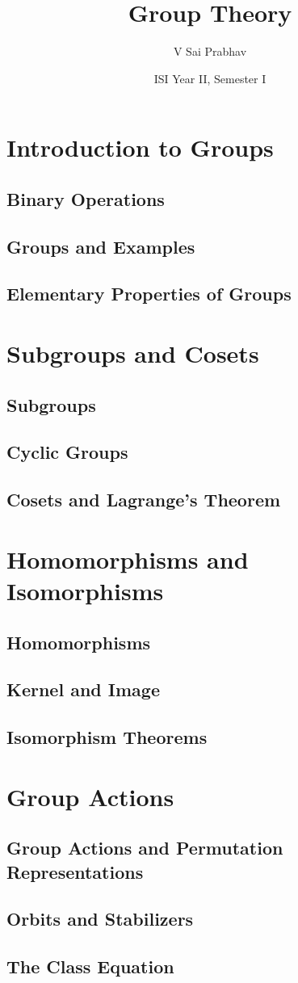 \documentclass{book}
\title{Group Theory}
\author{V Sai Prabhav}
\date{ISI Year II, Semester I}
\begin{document}
\maketitle

\chapter{Introduction to Groups}
\section{Binary Operations}
\section{Groups and Examples}
\section{Elementary Properties of Groups}

\chapter{Subgroups and Cosets}
\section{Subgroups}
\section{Cyclic Groups}
\section{Cosets and Lagrange's Theorem}

\chapter{Homomorphisms and Isomorphisms}
\section{Homomorphisms}
\section{Kernel and Image}
\section{Isomorphism Theorems}

\chapter{Group Actions}
\section{Group Actions and Permutation Representations}
\section{Orbits and Stabilizers}
\section{The Class Equation}

\printindex
\end{document}
